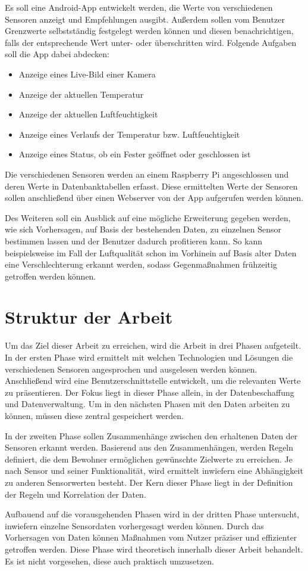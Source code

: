 Es soll eine Android-App entwickelt werden, die Werte von verschiedenen Sensoren anzeigt und Empfehlungen ausgibt. Außerdem sollen vom Benutzer Grenzwerte selbstständig festgelegt werden können und diesen benachrichtigen, falls der entsprechende Wert unter- oder überschritten wird. 
Folgende Aufgaben soll die App dabei abdecken:
\begin{itemize}
	\item Anzeige eines Live-Bild einer Kamera
	\item Anzeige der aktuellen Temperatur
	\item Anzeige der aktuellen Luftfeuchtigkeit
	\item Anzeige eines Verlaufs der Temperatur bzw. Luftfeuchtigkeit
	\item Anzeige eines Status, ob ein Fester geöffnet oder geschlossen ist
\end{itemize} 
Die verschiedenen Sensoren werden an einem Raspberry Pi angeschlossen und deren Werte in Datenbanktabellen erfasst. Diese ermittelten Werte der Sensoren sollen anschließend über einen Webserver von der App aufgerufen werden können.

Des Weiteren soll ein Ausblick auf eine mögliche Erweiterung gegeben werden, wie sich Vorhersagen, auf Basis der bestehenden Daten, zu einzelnen Sensor bestimmen lassen und der Benutzer dadurch profitieren kann. So kann beispielsweise im Fall der Luftqualität schon im Vorhinein auf Basis alter Daten eine Verschlechterung erkannt werden, sodass Gegenmaßnahmen frühzeitig getroffen werden können.
\section{Struktur der Arbeit}
Um das Ziel dieser Arbeit zu erreichen, wird die Arbeit in drei Phasen aufgeteilt. In der ersten Phase wird ermittelt mit welchen Technologien und Lösungen die verschiedenen Sensoren angesprochen und ausgelesen werden können. Anschließend wird eine Benutzerschnittstelle entwickelt, um die relevanten Werte zu präsentieren. Der Fokus liegt in dieser Phase allein, in der Datenbeschaffung und Datenverwaltung. Um in den nächsten Phasen mit den Daten arbeiten zu können, müssen diese zentral gespeichert werden.

In der zweiten Phase sollen Zusammenhänge zwischen den erhaltenen Daten der Sensoren erkannt werden. Basierend aus den Zusammenhängen, werden Regeln definiert, die dem Bewohner ermöglichen gewünschte Zielwerte zu erreichen. Je nach Sensor und seiner Funktionalität, wird ermittelt inwiefern eine Abhängigkeit zu anderen Sensorwerten besteht. Der Kern dieser Phase liegt in der Definition der Regeln und Korrelation der Daten.

Aufbauend auf die vorausgehenden Phasen wird in der dritten Phase untersucht, inwiefern einzelne Sensordaten vorhergesagt werden können. Durch das Vorhersagen von Daten können Maßnahmen vom Nutzer präziser und effizienter getroffen werden. Diese Phase wird theoretisch innerhalb dieser Arbeit behandelt. Es ist nicht vorgesehen, diese auch praktisch umzusetzen.